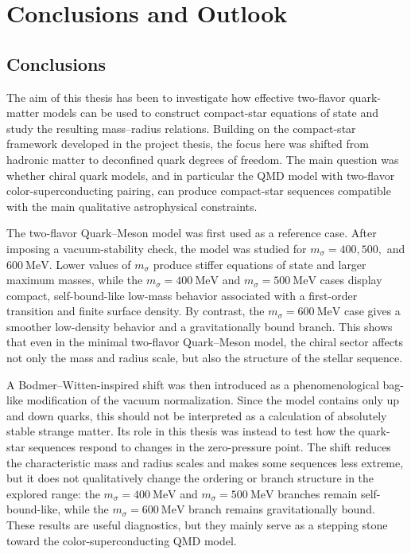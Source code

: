 \chapter{Conclusions and Outlook}

\section{Conclusions}

The aim of this thesis has been to investigate how effective two-flavor
quark-matter models can be used to construct compact-star equations of state and
study the resulting mass--radius relations. Building on the compact-star
framework developed in the project thesis, the focus here was shifted from
hadronic matter to deconfined quark degrees of freedom. The main question was
whether chiral quark models, and in particular the QMD model with two-flavor
color-superconducting pairing, can produce compact-star
sequences compatible with the main qualitative astrophysical constraints.

The two-flavor Quark--Meson model was first used as a reference case. After imposing a
vacuum-stability check, the model was studied for
\(m_\sigma=400,500,\) and \(600~\mathrm{MeV}\). Lower values of \(m_\sigma\)
produce stiffer equations of state and larger maximum masses, while the
\(m_\sigma=400~\mathrm{MeV}\) and \(m_\sigma=500~\mathrm{MeV}\) cases display
compact, self-bound-like low-mass behavior associated with a first-order
transition and finite surface density. By contrast, the
\(m_\sigma=600~\mathrm{MeV}\) case gives a smoother low-density behavior and a
gravitationally bound branch. This shows that even in the minimal two-flavor
Quark--Meson model, the chiral sector affects not only the mass and radius
scale, but also the structure of the stellar sequence.

A Bodmer--Witten-inspired shift was then introduced as a phenomenological
bag-like modification of the vacuum normalization. Since the model contains only
up and down quarks, this should not be interpreted as a calculation of
absolutely stable strange matter. Its role in this thesis was instead to test
how the quark-star sequences respond to changes in the zero-pressure point. The
shift reduces the characteristic mass and radius scales and makes some
sequences less extreme, but it does not qualitatively change the ordering or
branch structure in the explored range: the \(m_\sigma=400~\mathrm{MeV}\) and
\(m_\sigma=500~\mathrm{MeV}\) branches remain self-bound-like, while the
\(m_\sigma=600~\mathrm{MeV}\) branch remains gravitationally bound. These
results are useful diagnostics, but they mainly serve as a stepping stone toward
the color-superconducting QMD model.

